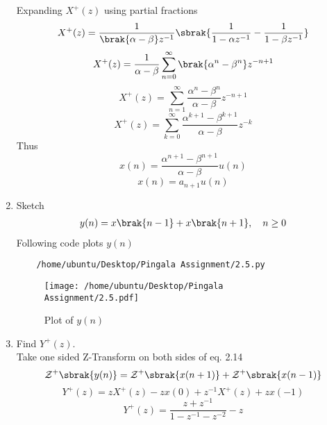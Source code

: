 \documentclass[journal,12pt,twocolumn]{IEEEtran}
\renewcommand\thesection{\arabic{section}}
\begin{document}
\begin{enumerate}[label=\thesection.\arabic*,ref=\thesection.\theenumi]
\solution
Expanding $X^{+}(z)$ using partial fractions
\begin{equation}
	X^{+}(z) = \frac{1}{\brak{\alpha - \beta}z^{-1}}\sbrak{\frac{1}{1 - \alpha{z^{-1}}} - \frac{1}{1 - \beta{z^{-1}}}}
\end{equation}
\begin{equation}
	X^{+}(z) = \frac{1}{\alpha - \beta}\sum_{n=0}^{\infty}\brak{{\alpha}^{n} - {\beta}^{n}}z^{-n+1}
\end{equation}
\begin{equation}
	X^{+}(z) = \sum_{n=1}^{\infty}\frac{{\alpha}^{n} - {\beta}^{n}}{\alpha - \beta}z^{-n+1}
\end{equation}
\begin{equation}
	X^{+}(z) = \sum_{k=0}^{\infty}\frac{{\alpha}^{k+1} - {\beta}^{k+1}}{\alpha - \beta}z^{-k}
\end{equation}
Thus
\begin{equation}
	x(n) = \frac{{\alpha}^{n+1} - {\beta}^{n+1}}{\alpha - \beta}u(n)
\end{equation}
\begin{equation}
	\boxed{x(n) = a_{n+1}u(n)}
\end{equation}
\item Sketch 
\begin{align}
	y(n)	 = x\brak{n-1} + x\brak{n+1},  \quad n \ge 0
	\label{eq:10-orig-diff-rev}
\end{align}
\solution
Following code plots $y(n)$
\begin{lstlisting}
	/home/ubuntu/Desktop/Pingala Assignment/2.5.py
\end{lstlisting}
\begin{figure}[!htp]
	\texttt{[image: /home/ubuntu/Desktop/Pingala Assignment/2.5.pdf]}
	\caption{Plot of $y(n)$}
	\label{fig:yn}
\end{figure}
\item Find $Y^{+}(z)$. \\
\solution
Take one sided Z-Transform on both sides of eq. 2.14
\begin{equation}
	\mathcal{Z}^{+}\sbrak{y(n)} = \mathcal{Z}^{+}\sbrak{x(n + 1)} + \mathcal{Z}^{+}\sbrak{x(n - 1)}
\end{equation}
\begin{equation}
	Y^{+}(z) = zX^{+}(z) - zx(0) + z^{-1}X^{+}(z) + zx(-1)
\end{equation}
\begin{equation}
	Y^{+}(z) = \frac{z + z^{-1}}{1 - z^{-1} - z^{-2}} - z
\end{equation}

\end{enumerate}
\end{document}
